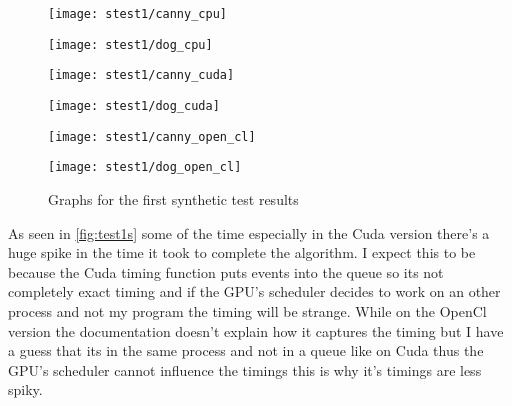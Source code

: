 \begin{table}[H]
\centering
{}
\caption{Test plans for the  Synthetic tester for \ac{DoG} algorithm}
\label{tab:sync_pic_dog}
\end{table}


\begin{figure}[H]
\centering
\begin{minipage}[t]{.49\textwidth}
\centering
\texttt{[image: stest1/canny\_cpu]}
\end{minipage}
\begin{minipage}[t]{.49\textwidth}
\centering
\texttt{[image: stest1/dog\_cpu]}
\end{minipage}
\begin{minipage}[t]{.49\textwidth}
\centering
\texttt{[image: stest1/canny\_cuda]}
\end{minipage}
\begin{minipage}[t]{.49\textwidth}
\centering
\texttt{[image: stest1/dog\_cuda]}
\end{minipage}
\begin{minipage}[t]{.49\textwidth}
\centering
\texttt{[image: stest1/canny\_open\_cl]}
\end{minipage}
\begin{minipage}[t]{.49\textwidth}
\centering
\texttt{[image: stest1/dog\_open\_cl]}
\end{minipage}
\caption{Graphs for the first synthetic test results}
\label{fig:test1s}
\end{figure}

As seen in \autoref{fig:test1s} some of the time especially in the Cuda version there's a huge spike in the time it took to complete the algorithm. I expect this to be because the Cuda timing function puts events into the queue so its not completely exact timing and if the \ac{GPU}'s scheduler decides to work on an other process and not my program the timing will be strange. While on the OpenCl version the documentation doesn't explain how it captures the timing but I have a guess that its in the same process and not in a queue like on Cuda thus the \ac{GPU}'s scheduler cannot influence the timings this is why it's timings are less spiky. 

